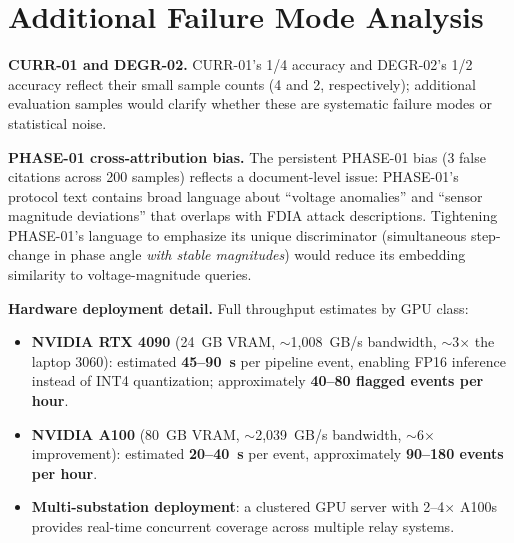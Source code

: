 \documentclass[twocolumn, 10pt, letterpaper]{article}
\begin{document}
\section{Additional Failure Mode Analysis}
\label{app:failures}

\textbf{CURR-01 and DEGR-02.}
CURR-01's 1/4 accuracy and DEGR-02's 1/2 accuracy reflect their small sample
counts (4 and 2, respectively); additional evaluation samples would clarify whether
these are systematic failure modes or statistical noise.

\textbf{PHASE-01 cross-attribution bias.}
The persistent PHASE-01 bias (3 false citations across 200 samples) reflects
a document-level issue: PHASE-01's protocol text contains broad language about
``voltage anomalies'' and ``sensor magnitude deviations'' that overlaps with
FDIA attack descriptions.
Tightening PHASE-01's language to emphasize its unique discriminator
(simultaneous step-change in phase angle \textit{with stable magnitudes})
would reduce its embedding similarity to voltage-magnitude queries.

\textbf{Hardware deployment detail.}
Full throughput estimates by GPU class:
\begin{itemize}
    \item \textbf{NVIDIA RTX 4090} (24~GB VRAM, $\sim$1,008~GB/s bandwidth,
          $\sim$3$\times$ the laptop 3060): estimated \textbf{45--90~s}
          per pipeline event, enabling FP16 inference instead of INT4 quantization;
          approximately \textbf{40--80 flagged events per hour}.
    \item \textbf{NVIDIA A100} (80~GB VRAM, $\sim$2,039~GB/s bandwidth,
          $\sim$6$\times$ improvement): estimated \textbf{20--40~s} per event,
          approximately \textbf{90--180 events per hour}.
    \item \textbf{Multi-substation deployment}: a clustered GPU server with
          2--4$\times$ A100s provides real-time concurrent coverage across
          multiple relay systems.
\end{itemize}
\end{document}
